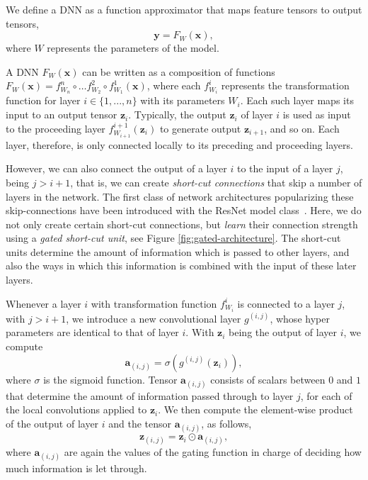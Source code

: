\documentclass{bmvc2k}
\begin{document}
We define a DNN as a function approximator that maps feature tensors to output tensors,
\begin{equation}
\label{eq:dnn}
\boldsymbol{y} = F_W(\boldsymbol{x}),
\end{equation} 
where $W$ represents the parameters of the model. 

A DNN $F_{W}(\boldsymbol{x})$ can be written as a composition of functions $F_W(\boldsymbol{x}) = f_{W_n}^n \circ \dots f_{W_2}^2 \circ f_{W_1}^1(\boldsymbol{x})$, where each $f^i_{W_i}$ represents the transformation function for layer $i \in \{1, ..., n\}$ with its parameters $W_i$. Each such layer maps its input to an output tensor $\boldsymbol{z}_{i}$. Typically, the output $\boldsymbol{z}_{i}$ of layer $i$  is used as input to the proceeding layer $f^{i+1}_{W_{i+1}}(\boldsymbol{z}_{i})$ to generate output $\boldsymbol{z}_{i+1}$, and so on. Each layer, therefore, is only connected locally to its preceding and proceeding layers.

However, we can also connect the output of a layer $i$ to the input of a layer $j$, being $j > i + 1$, that is, we can create \emph{short-cut connections} that skip a number of layers in the network. The first class of network architectures popularizing these skip-connections have been introduced with the ResNet model class~\cite{he2016deep}. Here, we do not only create certain short-cut connections, but \emph{learn} their connection strength using a \emph{gated short-cut unit}, see Figure \ref{fig:gated-architecture}. The short-cut units determine the amount of information which is passed to other layers, and also the ways in which this information is combined with the input of these later layers. 

Whenever a layer $i$ with transformation function $f^{i}_{W_i}$ is connected to a layer $j$, with $j > i + 1$, we introduce a new convolutional layer $g^{(i,j)}$, whose hyper parameters are identical to that of layer $i$. With $\boldsymbol{z}_i$ being the output of layer $i$, we compute 
\begin{equation}
\label{eq:gated_op}
\boldsymbol{a}_{(i,j)} = \sigma(g^{(i,j)}(\boldsymbol{z}_{i})),
\end{equation} 
where $\sigma$ is the sigmoid function. Tensor $\boldsymbol{a}_{(i,j)}$ consists of scalars between $0$ and $1$ that determine the amount of information passed through to layer $j$, for each of the local convolutions applied to $\boldsymbol{z}_{i}$. We then compute the element-wise product of the output of layer $i$ and the tensor $\boldsymbol{a}_{(i,j)}$, as follows,
\begin{equation}
\label{eq:gated_feat}
\boldsymbol{z}_{(i, j)} = \boldsymbol{z}_i \odot \boldsymbol{a}_{(i,j)},
\end{equation}
where $\boldsymbol{a}_{(i,j)}$ are again the values of the gating function in charge of deciding how much information is let through.
\end{document}
